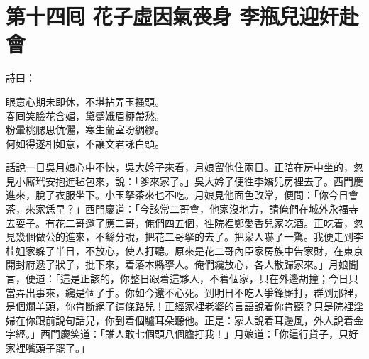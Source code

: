 
\chapter*{第十四囘 花子虛因氣䘮身 李瓶兒迎奸赴會}


詩曰：

\begin{myquote}
眼意心期未即休，不堪拈弄玉搔頭。\\春囘笑臉花含媚，黛蹙娥眉桺帶愁。\\粉暈桃腮思伉儷，寒生蘭室盼綢繆。\\何如得遂相如意，不讓文君詠白頭。
\end{myquote}

話說一日吳月娘心中不快，吳大妗子來看，月娘留他住兩日。正陪在房中坐的，忽見小厮玳安抱進毡包來，說：「爹來家了。」吳大妗子便徃李嬌兒房裡去了。西門慶進來，脫了衣服坐下。小玉拏茶來也不吃。月娘見他面色改常，便問：「你今日會茶，來家恁早？」西門慶道：「今該常二哥會，他家沒地方，請俺們在城外永福寺去耍子。有花二哥邀了應二哥，俺們四五個，徃院裡鄭愛香兒家吃酒。正吃着，忽見幾個做公的進來，不繇分說，把花二哥拏的去了。把衆人嚇了一驚。我便走到李桂姐家躲了半日，不放心，使人打聽。原來是花二哥內臣家房族中告家財，在東京開封府遞了狀子，批下來，着落本縣拏人。俺們纔放心，各人散歸家來。」月娘聞言，便道：「這是正該的，你整日跟着這夥人，不着個家，只在外邊胡撞；今日只當弄出事來，纔是個了手。你如今還不心死。到明日不吃人爭鋒厮打，群到那裡，是個爛羊頭，你肯斷絕了這條路兒！正經家裡老婆的言語說着你肯聽？只是院裡淫婦在你跟前說句話兒，你到着個驢耳朵聽他。正是：家人說着耳邊風，外人說着金字經。」西門慶笑道：「誰人敢七個頭八個膽打我！」{}月娘道：「你這行貨子，只好家裡嘴頭子罷了。」

